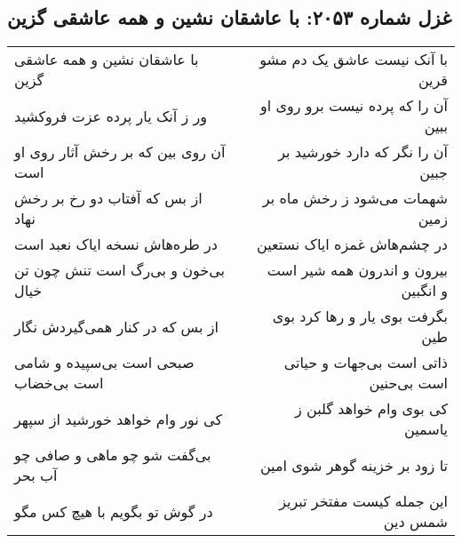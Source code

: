 \begin{center}
\section*{غزل شماره ۲۰۵۳: با عاشقان نشین و همه عاشقی گزین}
\label{sec:2053}
\begin{longtable}{l p{0.5cm} r}
با عاشقان نشین و همه عاشقی گزین
&&
با آنک نیست عاشق یک دم مشو قرین
\\
ور ز آنک یار پرده عزت فروکشید
&&
آن را که پرده نیست برو روی او ببین
\\
آن روی بین که بر رخش آثار روی او است
&&
آن را نگر که دارد خورشید بر جبین
\\
از بس که آفتاب دو رخ بر رخش نهاد
&&
شهمات می‌شود ز رخش ماه بر زمین
\\
در طره‌هاش نسخه ایاک نعبد است
&&
در چشم‌هاش غمزه ایاک نستعین
\\
بی‌خون و بی‌رگ است تنش چون تن خیال
&&
بیرون و اندرون همه شیر است و انگبین
\\
از بس که در کنار همی‌گیردش نگار
&&
بگرفت بوی یار و رها کرد بوی طین
\\
صبحی است بی‌سپیده و شامی است بی‌خضاب
&&
ذاتی است بی‌جهات و حیاتی است بی‌حنین
\\
کی نور وام خواهد خورشید از سپهر
&&
کی بوی وام خواهد گلبن ز یاسمین
\\
بی‌گفت شو چو ماهی و صافی چو آب بحر
&&
تا زود بر خزینه گوهر شوی امین
\\
در گوش تو بگویم با هیچ کس مگو
&&
این جمله کیست مفتخر تبریز شمس دین
\\
\end{longtable}
\end{center}
